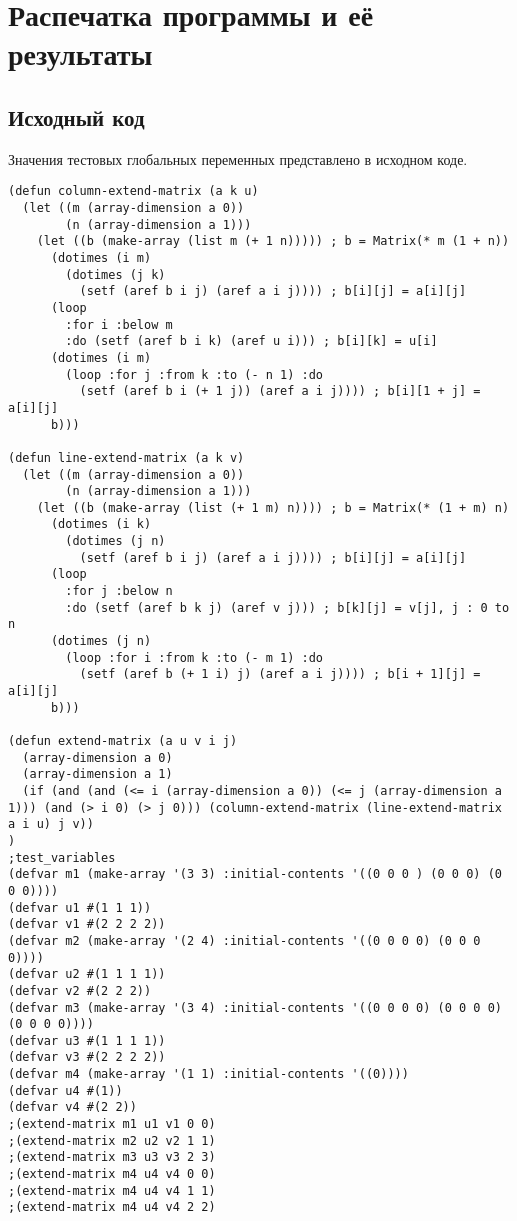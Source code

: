 \documentclass[12pt]{article}
\begin{document}
\section{Распечатка программы и её результаты}

\subsection{Исходный код}
Значения тестовых глобальных переменных представлено в исходном коде.
\begin{verbatim}
(defun column-extend-matrix (a k u)
  (let ((m (array-dimension a 0))
        (n (array-dimension a 1)))
    (let ((b (make-array (list m (+ 1 n))))) ; b = Matrix(* m (1 + n)) 
      (dotimes (i m)
        (dotimes (j k)
          (setf (aref b i j) (aref a i j)))) ; b[i][j] = a[i][j]
      (loop
        :for i :below m
        :do (setf (aref b i k) (aref u i))) ; b[i][k] = u[i]
      (dotimes (i m)
        (loop :for j :from k :to (- n 1) :do 
          (setf (aref b i (+ 1 j)) (aref a i j)))) ; b[i][1 + j] = a[i][j]
      b)))

(defun line-extend-matrix (a k v)
  (let ((m (array-dimension a 0))
        (n (array-dimension a 1)))
    (let ((b (make-array (list (+ 1 m) n)))) ; b = Matrix(* (1 + m) n)
      (dotimes (i k)
        (dotimes (j n)
          (setf (aref b i j) (aref a i j)))) ; b[i][j] = a[i][j]
      (loop
        :for j :below n
        :do (setf (aref b k j) (aref v j))) ; b[k][j] = v[j], j : 0 to n
      (dotimes (j n)
        (loop :for i :from k :to (- m 1) :do
          (setf (aref b (+ 1 i) j) (aref a i j)))) ; b[i + 1][j] = a[i][j]
      b)))

(defun extend-matrix (a u v i j)
  (array-dimension a 0)
  (array-dimension a 1)
  (if (and (and (<= i (array-dimension a 0)) (<= j (array-dimension a 1))) (and (> i 0) (> j 0))) (column-extend-matrix (line-extend-matrix a i u) j v))
)
;test_variables
(defvar m1 (make-array '(3 3) :initial-contents '((0 0 0 ) (0 0 0) (0 0 0))))
(defvar u1 #(1 1 1))
(defvar v1 #(2 2 2 2))
(defvar m2 (make-array '(2 4) :initial-contents '((0 0 0 0) (0 0 0 0))))
(defvar u2 #(1 1 1 1))
(defvar v2 #(2 2 2))
(defvar m3 (make-array '(3 4) :initial-contents '((0 0 0 0) (0 0 0 0) (0 0 0 0))))
(defvar u3 #(1 1 1 1))
(defvar v3 #(2 2 2 2))
(defvar m4 (make-array '(1 1) :initial-contents '((0))))
(defvar u4 #(1))
(defvar v4 #(2 2))
;(extend-matrix m1 u1 v1 0 0)
;(extend-matrix m2 u2 v2 1 1)
;(extend-matrix m3 u3 v3 2 3)
;(extend-matrix m4 u4 v4 0 0)
;(extend-matrix m4 u4 v4 1 1)
;(extend-matrix m4 u4 v4 2 2)
\end{verbatim}
%
\end{document}
